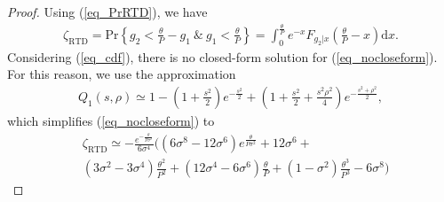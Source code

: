 \begin{proof}
Using (\ref{eq_PrRTD}), we have
\begin{align}
    \zeta_{\text{RTD}}= \text{Pr}\left\{g_2< \frac{\theta}{P}-g_1  ~\&~ g_1 < \frac{\theta}{P} \right\}=\int_{0}^{\frac{\theta}{P}} e^{- x} F_{g_2|x}\left(\frac{\theta}{P}-x\right) \text{d}x. \label{eq_nocloseform}
\end{align}
Considering (\ref{eq_cdf}), there is no closed-form solution for (\ref{eq_nocloseform}).  For this reason, we use the  approximation \cite[Eq. 14]{andras2011generalized} 
\begin{align}
    Q_1\left( s, \rho  \right) \simeq  1 - \left( 1 + \frac{s^2}{2} \right)e^{-\frac{s^2}{2}} +
    \left( 1 + \frac{s^2}{2} + \frac{s^2\rho^2}{4} \right)e^{-\frac{s^2+\rho^2}{2}},
\end{align}
which simplifies (\ref{eq_nocloseform}) to 
\begin{align}\label{eq_RTDnopa}
    &\zeta_{\text{RTD}} \simeq 
    -\frac{e^{-\frac{\theta}{P\sigma^2}}}{6\sigma^4}\Bigg(\left(6\sigma^8-12\sigma^6\right)e^{\frac{\theta}{P\sigma^2}}+12\sigma^6+\nonumber\\&\left(3\sigma^2-3\sigma^4\right)\frac{\theta^2}{P^2}+\left(12\sigma^4-6\sigma^6\right)\frac{\theta}{P}+\left(1-\sigma^2\right)\frac{\theta^3}{P^3}-6\sigma^8\Bigg)
\end{align}


\end{proof}
